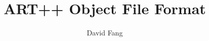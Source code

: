 \documentclass[12pt]{book}
\newif\ifpdf
\begin{document}
\title{ART++ Object File Format}
\author{David Fang}

\ifpdf\pdfbookmark[0]{Title Page}{title}\fi
\maketitle

\ifpdf\pdfbookmark[0]{Table of Contents}{toc}\fi
\tableofcontents


% 


% 

\clearpage
\ifpdf\pdfbookmark[0]{Index}{index}\fi
\printindex
\end{document}
